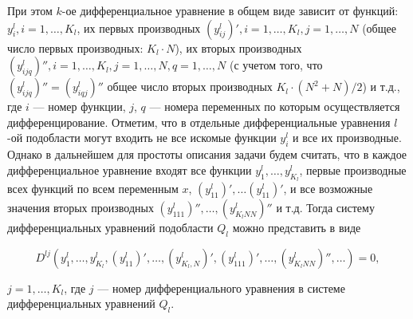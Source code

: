 \documentclass[a4paper,12pt]{article}
\begin{document}
При этом $k$-ое дифференциальное уравнение в общем виде зависит от функций:
$y^l_i, i = 1,\ldots,K_l$, их первых производных $(y^l_{ij})', i =
1,\ldots,K_l, j = 1, \ldots, N$ (общее число первых производных: $K_l \cdot
N$), их вторых производных $(y^l_{ijq})'', i = 1,\ldots,K_l, j =
1,\ldots,N, q = 1,\ldots,N$ (с учетом того, что $(y^l_{ijq})'' =
(y^l_{iqj})''$ общее число вторых производных $K_l \cdot (N^2+N) / 2$) и
т.д., где $i$ --- номер функции, $j$, $q$ --- номера переменных по которым
осуществляется дифференцирование. Отметим, что в отдельные дифференциальные
уравнения $l$-ой подобласти могут входить не все искомые функции $y^l_i$ и
все их производные.  Однако в дальнейшем для простоты описания задачи будем
считать, что в каждое дифференциальное уравнение входят все функции
$y^l_1,\ldots,y^l_{K_l}$, первые производные всех функций по всем
переменным $x$, $(y^l_{11})', \ldots (y^l_{11})'$, и все возможные значения
вторых производных $(y^l_{111})'', \ldots, (y^l_{K_lNN})''$ и т.д. Тогда
систему дифференциальных уравнений подобласти $Q_l$ можно представить в 
виде

\begin{equation}
    D^{lj}(y^l_1,\ldots,y^l_{K_l}, (y^l_{11})',\ldots, (y^l_{K_l,N})',
           (y^l_{111})',\ldots, (y^l_{K_lNN})'',\ldots) = 0,
\end{equation}

$j = 1, \ldots, K_l$, где $j$ --- номер дифференциального уравнения в 
системе дифференциальных уравнений $Q_l$.
\end{document}
